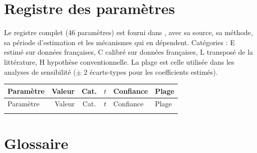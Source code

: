 \chapter{Registre des paramètres}
\label{ann:registre}

Le registre complet (46 paramètres) est fourni dans , avec sa source, sa méthode,
sa période d'estimation et les mécanismes qui en dépendent. Catégories : E estimé sur données françaises, C calibré sur
données françaises, L transposé de la littérature, H hypothèse conventionnelle. La plage est celle utilisée dans les
analyses de sensibilité ($\pm$ 2 écarts-types pour les coefficients estimés).

\begin{scriptsize}
\begin{longtable}{@{}p{5.6cm}rcrlp{3.6cm}@{}}
\toprule
Paramètre & Valeur & Cat. & $t$ & Confiance & Plage \\
\midrule\endfirsthead
\toprule Paramètre & Valeur & Cat. & $t$ & Confiance & Plage \\ \midrule\endhead
\bottomrule\endfoot

\end{longtable}
\end{scriptsize}

\chapter{Glossaire}
\label{ann:glossaire}


